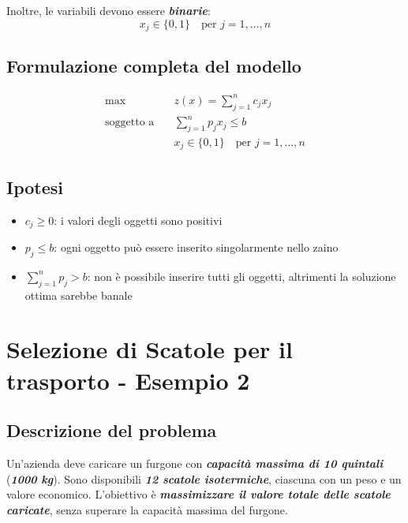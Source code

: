 Inoltre, le variabili devono essere \textbf{\textit{binarie}}:
\[
x_j \in \{0, 1\} \quad \text{per } j = 1, \ldots, n
\]

\subsection{Formulazione completa del modello}
\[
\begin{aligned}
\max \quad & z(x) = \sum_{j=1}^{n} c_j x_j \\
\text{soggetto a} \quad & \sum_{j=1}^{n} p_j x_j \leq b \\
& x_j \in \{0, 1\} \quad \text{per } j = 1, \dots, n
\end{aligned}
\]

\subsection{Ipotesi}
\begin{itemize}
    \item $c_j \geq 0$: i valori degli oggetti sono positivi
    \item $p_j \leq b$: ogni oggetto può essere inserito singolarmente nello zaino
    \item $\sum_{j=1}^{n} p_j > b$: non è possibile inserire tutti gli oggetti, altrimenti la soluzione ottima sarebbe banale
\end{itemize}

\section{Selezione di Scatole per il trasporto - Esempio 2}
\subsection{Descrizione del problema}

Un'azienda deve caricare un furgone con \textbf{\textit{capacità massima di 10 quintali}} 
(\textbf{\textit{1000 kg}}). Sono disponibili \textbf{\textit{12 scatole isotermiche}}, ciascuna con un peso e un valore 
economico. L'obiettivo è \textbf{\textit{massimizzare il valore totale delle scatole caricate}}, 
senza superare la capacità massima del furgone.

